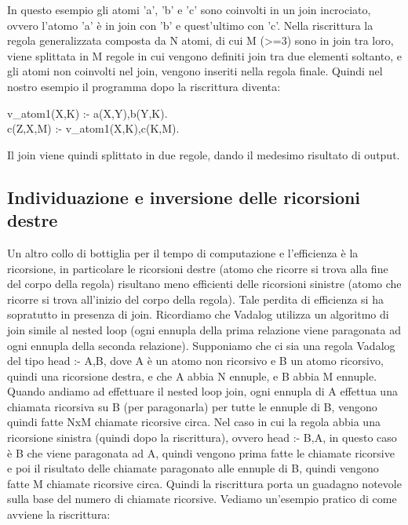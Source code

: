 In questo esempio gli atomi 'a', 'b' e 'c' sono coinvolti in un join incrociato, ovvero l'atomo 'a' è in join con 'b' e quest'ultimo con 'c'. \newline
Nella riscrittura la regola generalizzata composta da N atomi, di cui M (>=3) sono in join tra loro, viene splittata in M regole in cui vengono definiti join tra due elementi soltanto, e gli atomi non coinvolti nel join, vengono inseriti nella regola finale. \newline
Quindi nel nostro esempio il programma dopo la riscrittura diventa: 

\begin{algorithm}
	v\_atom1(X,K) :- a(X,Y),b(Y,K). \\
	c(Z,X,M) :- v\_atom1(X,K),c(K,M).
\end{algorithm}

Il join viene quindi splittato in due regole, dando il medesimo risultato di output.

\subsection{Individuazione e inversione delle ricorsioni destre}

Un altro collo di bottiglia per il tempo di computazione e l'efficienza è la ricorsione, in particolare le ricorsioni destre (atomo che ricorre si trova alla fine del corpo della regola) risultano meno efficienti delle ricorsioni sinistre (atomo che ricorre si trova all'inizio del corpo della regola). \newline
Tale perdita di efficienza si ha sopratutto in presenza di join. Ricordiamo che Vadalog utilizza un algoritmo di join simile al nested loop (ogni ennupla della prima relazione viene paragonata ad ogni ennupla della seconda relazione). \newline
Supponiamo che ci sia una regola Vadalog del tipo head :- A,B, dove A è un atomo non ricorsivo e B un atomo ricorsivo, quindi una ricorsione destra, e che A abbia N ennuple, e B abbia M ennuple. \newline
Quando andiamo ad effettuare il nested loop join, ogni ennupla di A effettua una chiamata ricorsiva su B (per paragonarla) per tutte le ennuple di B, vengono quindi fatte NxM chiamate ricorsive circa. \newline
Nel caso in cui la regola abbia una ricorsione sinistra (quindi dopo la riscrittura), ovvero head :- B,A, in  questo caso è B che viene paragonata ad A, quindi vengono prima fatte le chiamate ricorsive e poi il risultato delle chiamate paragonato alle ennuple di B, quindi vengono fatte M chiamate ricorsive circa. Quindi la riscrittura porta un guadagno notevole sulla base del numero di chiamate ricorsive. \newline
Vediamo un'esempio pratico di come avviene la riscrittura: 

